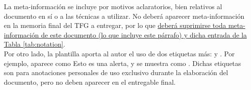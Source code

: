 \begin{shaded}
La meta-información se incluye por motivos aclaratorios, bien relativos al documento en sí o a las técnicas a utilizar. No deberá aparecer meta-información en la memoria final del \ac{TFG} a entregar, por lo que \underline{deberá suprimirse toda meta-información de este documento (lo que incluye este párrafo) y dicha entrada de la Tabla \ref{tab:notation}}.\\

Por otro lado, la plantilla aporta al autor el uso de dos etiquetas más:  y . Por ejemplo,  aparece como \alert{Esto es una alerta}, y  se muestra como . Dichas etiquetas son para anotaciones personales de uso exclusivo durante la elaboración del documento, pero no deben aparecer en el entregable final.\\


\end{shaded}
